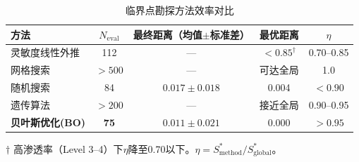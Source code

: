 \begin{table}[htbp]
\centering
\caption{临界点勘探方法效率对比}
\label{tab:bo_efficiency}
\begin{tabular}{lcccc}
\toprule
方法 & $N_{\text{eval}}$ & 最终距离（均值$\pm$标准差） & 最优距离 & $\eta$ \\
\midrule
灵敏度线性外推 & 112 & --- & $<0.85^{\dagger}$ & 0.70--0.85 \\
网格搜索 & $>500$ & --- & 可达全局 & 1.0 \\
随机搜索 & 84 & $0.017 \pm 0.018$ & 0.004 & $<0.90$ \\
遗传算法 & $>200$ & --- & 接近全局 & 0.90--0.95 \\
\textbf{贝叶斯优化(BO)} & \textbf{75} & $\mathbf{0.011 \pm 0.021}$ & $\mathbf{0.000}$ & $\mathbf{>0.95}$ \\
\bottomrule
\end{tabular}
\begin{tablenotes}
\footnotesize
\item $\dagger$ 高渗透率（Level 3--4）下$\eta$降至0.70以下。$\eta = S^*_{\text{method}} / S^*_{\text{global}}$。
\end{tablenotes}
\end{table}

